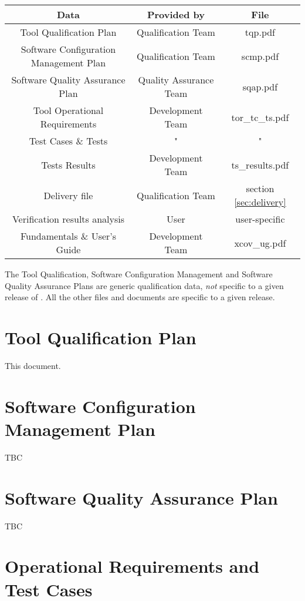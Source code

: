 \documentclass {report}
\begin{document}
\begin{tabular}{|c|c|c|}
\hline
\textbf{Data} & \textbf{Provided by} & \textbf{File} \\ \hline
Tool Qualification Plan & Qualification Team & tqp.pdf \\ \hline
Software Configuration Management Plan & Qualification Team & scmp.pdf \\ \hline
Software Quality Assurance Plan & Quality Assurance Team & sqap.pdf \\ \hline
Tool Operational Requirements & Development Team & tor\_tc\_ts.pdf \\ \hline
Test Cases \& Tests & " & " \\ \hline
Tests Results & Development Team & ts\_results.pdf \\ \hline
Delivery file & Qualification Team & section \ref{sec:delivery} \\ \hline
Verification results analysis & User & user-specific \\ \hline
\xcov{} Fundamentals \& User's Guide & Development Team & xcov\_ug.pdf \\ \hline
\end{tabular}

The Tool Qualification, Software Configuration Management and Software Quality
Assurance Plans are generic qualification data, \emph{not} specific to a given
release of \xcov{}.
%
All the other files and documents are specific to a given \xcov{}
release.

\section{Tool Qualification Plan}

This document.

\section{Software Configuration Management Plan}

TBC

\section{Software Quality Assurance Plan}

TBC

\section{Operational Requirements and Test Cases}
\end{document}
